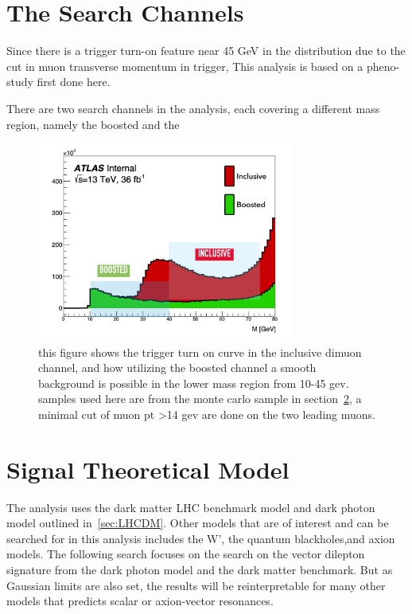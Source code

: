 \section{The Search Channels}
Since there is a trigger turn-on feature near 45 GeV in the distribution due to the cut in muon transverse momentum in trigger, 
This analysis is based on a pheno-study first done here\cite{2014}.

There are two search channels in the analysis, each covering a different mass region, namely the boosted and the 

\begin{figure}[!htb]
    \begin{center}
        \includegraphics[width=0.75\textwidth]{figures/chapter_dimuon/turnon}
        \caption{
        this figure shows the trigger turn on curve in the inclusive dimuon channel, and how utilizing the boosted channel a smooth background is possible in the lower mass region from 10-45 gev. samples used here are from the monte carlo sample in section~\ref{}, a minimal cut of muon pt >14 gev are done on the two leading muons. }
            \label{fig:turnon}
    \end{center}
\end{figure}

\section{Signal Theoretical Model}

    The analysis uses the dark matter LHC benchmark model and dark photon model outlined in~\ref{sec:LHCDM}.
Other models that are of interest and can be searched for in this analysis includes the W', the quantum blackholes,and axion models. 
The following search focuses on the search on the vector dilepton signature from the dark photon model and the dark matter benchmark. But as Gaussian limits are also set, the results will be reinterpretable for many other models that predicts scalar or axion-vector resonances. 


